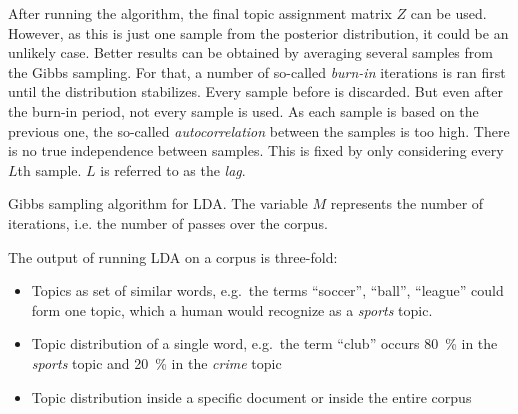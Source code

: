 \documentclass[
        a4paper,
        titlepage,
        twoside,
        parskip
        ]{scrbook}
\theoremstyle{break}
\begin{document}
After running the algorithm, the final topic assignment matrix $Z$ can be used.
However, as this is just one sample from the posterior distribution, it could be an unlikely case.
Better results can be obtained by averaging several samples from the Gibbs sampling.
For that, a number of so-called \emph{burn-in} iterations is ran first until the distribution stabilizes.
Every sample before is discarded.
But even after the burn-in period, not every sample is used.
As each sample is based on the previous one, the so-called \emph{autocorrelation} between the samples is too high.
There is no true independence between samples.
This is fixed by only considering every $L$th sample.
$L$ is referred to as the \emph{lag}.

\begin{algorithm}
  \caption{Gibbs sampling algorithm for LDA. The variable $M$ represents the number of iterations, i.e. the number of passes over the corpus.}
  \label{alg:gibbs_sampling}
  \begin{algorithmic}[1]
        \EndFor
      \EndFor
    \EndFor
    \EndProcedure
  \end{algorithmic}
\end{algorithm}
\label{sec:lda}

The output of running LDA on a corpus is three-fold:
\begin{itemize}
  \item Topics as set of similar words, e.g.\ the terms ``soccer'', ``ball'', ``league'' could form one topic, which a human would recognize as a \emph{sports} topic.
  \item Topic distribution of a single word, e.g.\ the term ``club'' occurs 80~\% in the \emph{sports} topic and 20~\% in the \emph{crime} topic
  \item Topic distribution inside a specific document or inside the entire corpus
\end{itemize}
\end{document}
